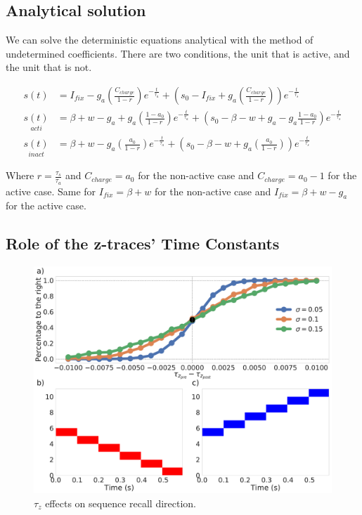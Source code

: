\documentclass[10pt,a4paper]{article}
\begin{document}
\subsection{Analytical solution}
We can solve the deterministic equations analytical with the method of undetermined coefficients. There are two conditions, the unit that is active, and the unit that is not. 


\begin{align*} 
s(t) &= I_{fix} - g_a\left(\frac{C_{charge}}{1 - r} \right) e^{-\frac{t}{\tau_a}} + \left(s_0 - I_{fix} + g_a \left( \frac{C_{charge}}{1 - r}\right)\right)e^{-\frac{t}{\tau_s}} \\
\underset{acti}{s(t)} &= \beta + w - g_a + g_a \left(\frac{1 - a_0}{1 - r}\right) e^{-\frac{t}{\tau_a}} + \left(s_0 - \beta - w + g_a - g_a \frac{1 - a_0}{1 - r}\right) e^{-\frac{t}{\tau_s}}  \\ 
\underset{inact}{s(t)} &= \beta + w - g_a \left( \frac{a_0}{1 - r} \right) e^{-\frac{t}{\tau_a}} + \left(s_0 - \beta  - w  + g_a \left( \frac{a_0}{1 - r} \right) \right) e^{-\frac{t}{\tau_s}} 
\end{align*}

Where $r=\frac{\tau_s}{\tau_a}$ and $C_{charge}=a_0$ for the non-active case and $C_{charge} = a_0 - 1$ for the active case. Same for $I_{fix}=\beta + w$ for the non-active case and $I_{fix} = \beta + w - g_a$ for the active case. 

\subsection{Role of the z-traces' Time Constants}
\begin{figure}[H]
\centering
\includegraphics[scale=0.20]{asymmetry.pdf}
\caption{$\tau_z$ effects on sequence recall direction. }
\label{fig:z-assymetry}
\end{figure}
\end{document}

